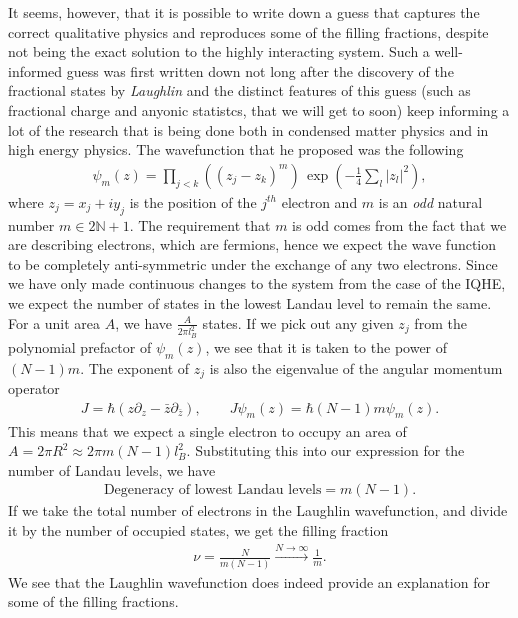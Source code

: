  It seems, however, that it is possible to write down a guess that captures the correct qualitative physics and reproduces some of the filling fractions, despite not being the exact solution to the highly interacting system. Such a well-informed guess was first written down not long after the discovery of the fractional states by \textit{Laughlin} \cite{Laughlin:1983fy} and the distinct features of this guess (such as fractional charge and anyonic statistcs, that we will get to soon) keep informing a lot of the research that is being done both in condensed matter physics and in high energy physics. The wavefunction that he proposed was the following 
\begin{align}
    \psi_m(z)= \prod_{j<k} \left((z_j -z_k)^m \right)\, \exp\left(- \frac{1}{4}\sum\limits_{l}|z_l|^2\right),
\end{align}
 where $z_j= x_j+iy_j$ is the position of the $j^{th}$ electron and $m$ is an \textit{odd} natural number $m \in 2\mathbb{N}+1$. The requirement that $m$ is odd comes from the fact that we are describing electrons, which are fermions, hence we expect the wave function to be completely anti-symmetric under the exchange of any two electrons. Since we have only made continuous changes to the system from the case of the IQHE, we expect the number of states in the lowest Landau level to remain the same. For a unit area $A$, we have $\frac{A}{2\pi l_B^2}$ states. If we pick out any given $z_j$ from the polynomial prefactor of $\psi_m(z)$, we see that it is taken to the power of $(N-1)m$. The exponent of $z_j$ is also the eigenvalue of the angular momentum operator
\begin{align}
    J = \hbar \left(z \partial_z -\bar{z} \partial_{\bar{z}}\right), \qquad J\psi_m(z) = \hbar (N-1)m \psi_m(z).
\end{align}
 This means that we expect a single electron to occupy an area of $A= 2\pi R^2 \approx 2\pi m (N-1)l_B^2$. Substituting this into our expression for the number of Landau levels, we have
\begin{align}
    \text{Degeneracy of lowest Landau levels} = m(N-1). 
\end{align}
 If we take the total number of electrons in the Laughlin wavefunction, and divide it by the number of occupied states, we get the filling fraction
\begin{align}
    \nu = \frac{N}{m (N-1)} \xrightarrow{N \rightarrow \infty} \frac{1}{m}.
\end{align}
 We see that the Laughlin wavefunction does indeed provide an explanation for some of the filling fractions. 

